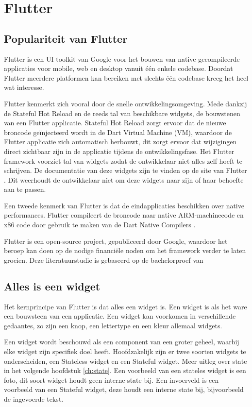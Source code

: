 \section{Flutter}
\subsection{Populariteit van Flutter}
Flutter is een UI toolkit van Google voor het bouwen van native gecompileerde applicaties voor mobile, web en desktop vanuit één enkele codebase. Doordat Flutter meerdere platformen kan bereiken met slechts één codebase kreeg het heel wat interesse. 

Flutter kenmerkt zich vooral door de snelle ontwikkelingsomgeving. Mede dankzij de Stateful Hot Reload en de reeds tal van beschikbare widgets, de bouwstenen van een Flutter applicatie. Stateful Hot Reload zorgt ervoor dat de nieuwe broncode geïnjecteerd wordt in de Dart Virtual Machine (VM), waardoor de Flutter applicatie zich automatisch herbouwt, dit zorgt ervoor dat wijzigingen direct zichtbaar zijn in de applicatie tijdens de ontwikkelingsfase. Het Flutter framework voorziet tal van widgets zodat de ontwikkelaar niet alles zelf hoeft te schrijven. De documentatie van deze widgets zijn te vinden op de site van Flutter \autocite{Flutter2019}. Dit weerhoudt de ontwikkelaar niet om deze widgets naar zijn of haar behoefte aan te passen.

Een tweede kenmerk van Flutter is dat de eindapplicaties beschikken over native performances. Flutter compileert de broncode naar native ARM-machinecode en x86 code door gebruik te maken van de Dart Native Compilers \autocite{Dart2019}.

Flutter is een open-source project, gepubliceerd door Google, waardoor het beroep kan doen op de nodige financiële noden om het framework verder te laten groeien. 
Deze literatuurstudie is gebaseerd op de bachelorproef van \autocite{Coninck2019}

\subsection{Alles is een widget}
\label{ch:alles-is-een-widget}
Het kernprincipe van Flutter is dat alles een widget is. Een widget is als het ware een bouwsteen van een applicatie. Een widget kan voorkomen in verschillende gedaantes, zo zijn een knop, een lettertype en een kleur allemaal widgets. 

Een widget wordt beschouwd als een component van een groter geheel, waarbij elke widget zijn specifiek doel heeft.
Hoofdzakelijk zijn er twee soorten widgets te onderscheiden, een Stateless widget en een Stateful widget. Meer uitleg over state in het volgende hoofdstuk \ref{ch:state}. Een voorbeeld van een stateles widget is een foto, dit soort widget houdt geen interne state bij. Een invoerveld is een voorbeeld van een Stateful widget, deze houdt een interne state bij, bijvoorbeeld de ingevoerde tekst. 
\newline

